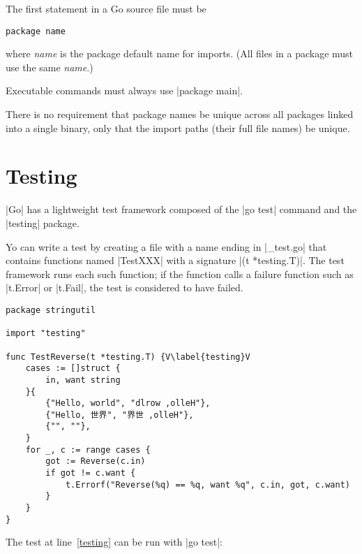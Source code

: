 The first statement in a Go source file must be

\begin{verbatim}
package name
\end{verbatim}

where \emph{name} is the package default name for imports. (All files
in a package must use the same \emph{name}.)

Executable commands must always use |package main|.

There is no requirement that package names be unique across all packages linked into a single binary, only that the import paths (their full file names) be unique.

\section{Testing}

|Go| has a lightweight test framework composed of the |go test| command
and the |testing| package. 

Yo can write a test by creating a file with a name ending in |_test.go|
that contains functions named |TestXXX| with a signature |(t *testing.T)|. The test framework runs each such function; if the function calls a failure function such as |t.Error| or |t.Fail|, the test is considered to have failed.



\begin{verbatim}
package stringutil

import "testing"

func TestReverse(t *testing.T) {V\label{testing}V
	cases := []struct {
		in, want string
	}{
		{"Hello, world", "dlrow ,olleH"},
		{"Hello, 世界", "界世 ,olleH"},
		{"", ""},
	}
	for _, c := range cases {
		got := Reverse(c.in)
		if got != c.want {
			t.Errorf("Reverse(%q) == %q, want %q", c.in, got, c.want)
		}
	}
}
\end{verbatim}

The test at line~\ref{testing} can be run with |go test|:


